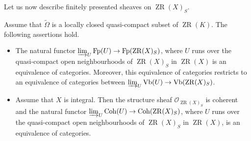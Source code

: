 \documentclass [11pt,reqno]{amsart}
\newcommand{\1}{\mathmybb{1}}
\def\cO{{\mathcal{O}}}
\def\ZR{\operatorname{ZR}}
\def\tilde{\widetilde}
\begin{document}
Let us now describe finitely presented sheaves on $\ZR(X)_{S}$. 

\begin{proposition}
\label{prop:vector_bundles_ZR_adelic_curve}
Assume that $\tilde{\Omega}$ is a locally closed quasi-compact subset of $\ZR(K)$. The following assertions hold.
\begin{itemize}
	\item[(1)] The natural functor $\varinjlim_{U}\mathrm{Fp}(U) \to \mathrm{Fp}(\ZR(X)_{S})$, where $U$ runs over the quasi-compact open neighbourhoods of $\ZR(X)_{S}$ in $\ZR(X)$ is an equivalence of categories. Moreover, this equivalence of categories restricts to an equivalence of categories between $\varinjlim_{U}\mathrm{Vb}(U) \to \mathrm{Vb}(\ZR(X)_{S})$.
	\item[(2)] Assume that $X$ is integral. Then the structure sheaf $\cO_{\ZR(X)_{S}}$ is coherent and the natural functor $\varinjlim_{U}\mathrm{Coh}(U) \to \mathrm{Coh}(\ZR(X)_{S})$, where $U$ runs over the quasi-compact open neighbourhoods of $\ZR(X)_{S}$ in $\ZR(X)$, is an equivalence of categories.
\end{itemize}
\end{proposition}
\end{document}
